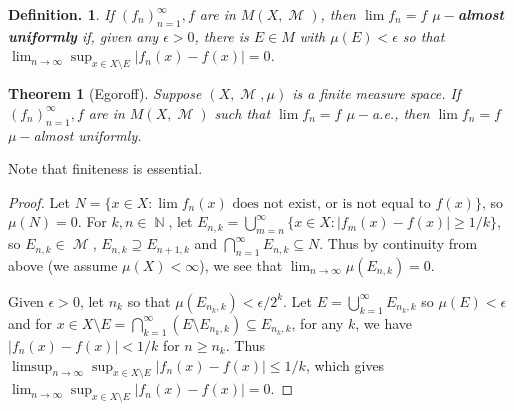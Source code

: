 \documentclass[12pt, a4paper]{memoir}
\DeclareMathOperator{\N}{{\mathbb{N}}}
\newtheorem{theorem}{Theorem}[section]
\theoremstyle{nonumberplain}
\newtheorem{definition}{Definition.}
\newtheorem{proof}{Proof}
\DeclareMathOperator{\M}{\mathcal{M}}
\begin{document}
\begin{definition}
    If $(f_n)_{n=1}^\infty,f$ are in $M(X,\M)$, then $\lim f_n=f$ \textbf{$\mu-$almost uniformly} if, given any $\epsilon>0$, there is $E\in M$ with $\mu(E)<\epsilon$ so that $\lim_{n\to\infty}\sup_{x\in X\setminus E}|f_n(x)-f(x)|=0$.
\end{definition}
\begin{theorem}[Egoroff]
    Suppose $(X,\M,\mu)$ is a finite measure space.
    If $(f_n)_{n=1}^\infty,f$ are in $M(X,\M)$ such that $\lim f_n=f$ $\mu-$a.e., then $\lim f_n=f$ $\mu-$almost uniformly.
\end{theorem}
Note that finiteness is essential.
\begin{proof}
    Let $N=\{x\in X:\lim f_n(x)\text{ does not exist, or is not equal to $f(x)$}\}$, so $\mu(N)=0$.
    For $k,n\in\N$, let $E_{n,k}=\bigcup_{m=n}^\infty\{x\in X:|f_m(x)-f(x)|\geq 1/k\}$, so $E_{n,k}\in\M$, $E_{n,k}\supseteq E_{n+1,k}$ and $\bigcap_{n=1}^\infty E_{n,k}\subseteq N$.
    Thus by continuity from above (we assume $\mu(X)<\infty$), we see that $\lim_{n\to\infty}\mu(E_{n,k})=0$.

    Given $\epsilon>0$, let $n_k$ so that $\mu(E_{n_k,k})<\epsilon/2^k$.
    Let $E=\bigcup_{k=1}^\infty E_{n_k,k}$ so $\mu(E)<\epsilon$ and for $x\in X\setminus E=\bigcap_{k=1}^\infty(E\setminus E_{n_k,k})\subseteq E_{n_k,k}$, for any $k$, we have $|f_n(x)-f(x)|<1/k$ for $n\geq n_k$.
    Thus $\limsup_{n\to\infty}\sup_{x\in X\setminus E}|f_n(x)-f(x)|\leq 1/k$, which gives $\lim_{n\to\infty}\sup_{x\in X\setminus E}|f_n(x)-f(x)|=0$.
\end{proof}
\end{document}
